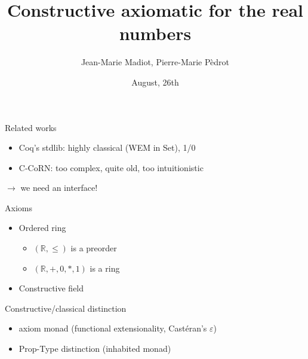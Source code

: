 \documentclass[draft]{beamer}
\author{Jean-Marie Madiot, Pierre-Marie Pèdrot}
\title{Constructive axiomatic for the real numbers}
\institute{Coqtail Junior Laboratory\\
	ENS Lyon}
\date{August, 26th}
\newcommand{\R}{\mathbb{R}}
\begin{document}
\begin{frame}[t,plain]
\titlepage
\end{frame}

\begin{frame}{Related works}
  \begin{itemize}
    \item Coq's stdlib: highly classical (WEM in Set), 1/0
    \item C-CoRN: too complex, quite old, too intuitionistic
  \end{itemize}
  $→$ we need an interface!
\end{frame}

\begin{frame}{Axioms}
  \begin{itemize}
    \item Ordered ring
      \begin{itemize}
        \item $(\R, ≤)$ is a preorder
        \item $(\R, +, 0, *, 1)$ is a ring
      \end{itemize}
    \item Constructive field
  \end{itemize}
\end{frame}

\begin{frame}{Constructive/classical distinction}
  \begin{itemize}
    \item axiom monad (functional extensionality, Castéran's $\varepsilon$)
    \item Prop-Type distinction (inhabited monad)
  \end{itemize}
\end{frame}
\end{document}
